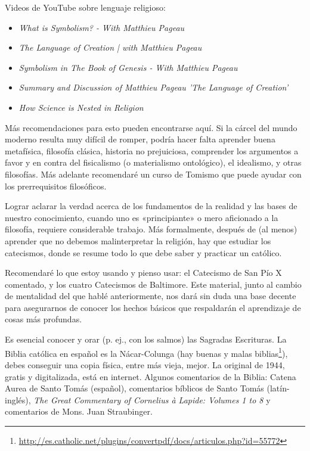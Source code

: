 \documentclass[12pt]{article}
\begin{document}
Videos de YouTube sobre lenguaje religioso:

\begin{itemize}
	\item \textit{What is Symbolism? - With Matthieu Pageau}
	\item \textit{The Language of Creation | with Matthieu Pageau}
	\item \textit{Symbolism in The Book of Genesis - With Matthieu Pageau}
	\item \textit{Summary and Discussion of Matthieu Pageau 'The Language of
		Creation'}
	\item \textit{How Science is Nested in Religion}
\end{itemize}

Más recomendaciones para esto pueden encontrarse aquí. Si la cárcel del mundo
moderno resulta muy difícil de romper, podría hacer falta aprender buena
metafísica, filosofía clásica, historia no prejuiciosa, comprender los
argumentos a favor y en contra del fisicalismo (o materialismo ontológico), el
idealismo, y otras filosofías. Más adelante recomendaré un curso de
Tomismo que puede ayudar con los prerrequisitos filosóficos.

Lograr aclarar la
verdad acerca de los fundamentos de la realidad y las bases de nuestro
conocimiento, cuando uno es «principiante» o mero aficionado a la filosofía,
requiere considerable trabajo. Más formalmente, después de (al menos) aprender
que no debemos malinterpretar la religión, hay que estudiar los catecismos,
donde se resume todo lo que debe saber y practicar un católico.

Recomendaré lo
que estoy usando y pienso usar: el Catecismo de San Pío X comentado,
y los cuatro Catecismos de Baltimore. Este material, junto al cambio de
mentalidad del que hablé anteriormente, nos dará sin duda una base decente para
asegurarnos de conocer los hechos básicos que respaldarán el aprendizaje de
cosas más profundas.

Es esencial conocer y orar (p. ej., con los salmos) las Sagradas Escrituras. La
Biblia católica en español es la Nácar-Colunga (hay buenas y malas
biblias\footnote{\url{http://es.catholic.net/plugins/convertpdf/docs/articulos.php?id=55772}}),
debes conseguir una copia física, entre más vieja, mejor. La original de 1944,
gratis y digitalizada, está en internet. Algunos comentarios de la Biblia:
Catena Aurea
de Santo Tomás (español), comentarios bíblicos de Santo Tomás (latín-inglés),
\textit{The Great Commentary of Cornelius à Lapide: Volumes 1 to 8} y
comentarios de Mons. Juan Straubinger.
\end{document}
